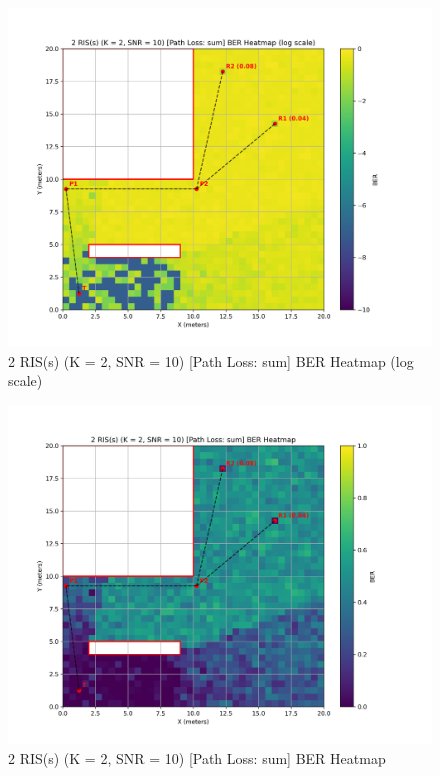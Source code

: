 \begin{figure}[H]
  \centering
  \includegraphics[width=0.8\linewidth]{imgs/heatmap-simulations/2 RIS(s) (K = 2, SNR = 10) [Path Loss_ sum] BER Heatmap (log scale).png}
  \caption{2 RIS(s) (K = 2, SNR = 10) [Path Loss: sum] BER Heatmap (log scale)}
\end{figure}

\begin{figure}[H]
  \centering
  \includegraphics[width=0.8\linewidth]{imgs/heatmap-simulations/2 RIS(s) (K = 2, SNR = 10) [Path Loss_ sum] BER Heatmap.png}
  \caption{2 RIS(s) (K = 2, SNR = 10) [Path Loss: sum] BER Heatmap}
\end{figure}

